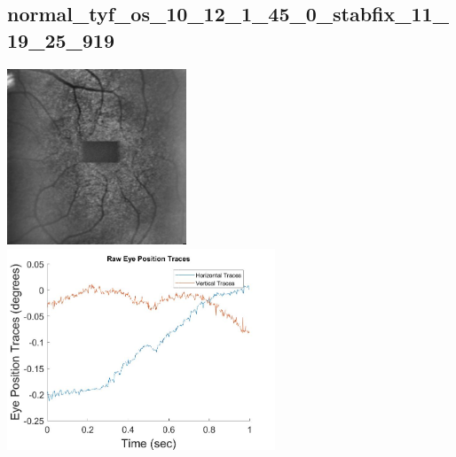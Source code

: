 \documentclass[11pt]{article}
\begin{document}
\subsection{normal\_tyf\_os\_10\_12\_1\_45\_0\_stabfix\_11\_19\_25\_919}
\includegraphics[width=0.40\textwidth, valign=m]{referenceframes/tslo_normal/normal_tyf_os_10_12_1_45_0_stabfix_11_19_25_919_dwt_nostim_gamscaled_bandfilt_refframe.jpg}
\includegraphics[width=0.60\textwidth, valign=m]{eyepositiontraces/tslo_normal/normal_tyf_os_10_12_1_45_0_stabfix_11_19_25_919.jpg}\\
\end{document}
